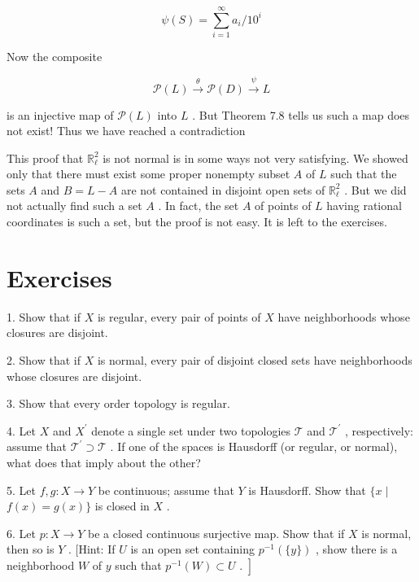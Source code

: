 \[
\psi \left( S\right)  = \mathop{\sum }\limits_{{i = 1}}^{\infty }{a}_{i}/{10}^{i}
\]

Now the composite

\[
\mathcal{P}\left( L\right) \overset{\theta }{ \rightarrow  }\mathcal{P}\left( D\right) \overset{\psi }{ \rightarrow  }L
\]

is an injective map of \(\mathcal{P}\left( L\right)\) into \(L\) . But Theorem 7.8 tells us such a map does not exist! Thus we have reached a contradiction

This proof that \({\mathbb{R}}_{\ell }^{2}\) is not normal is in some ways not very satisfying. We showed only that there must exist some proper nonempty subset \(A\) of \(L\) such that the sets \(A\) and \(B = L - A\) are not contained in disjoint open sets of \({\mathbb{R}}_{\ell }^{2}\) . But we did not actually find such a set \(A\) . In fact, the set \(A\) of points of \(L\) having rational coordinates is such a set, but the proof is not easy. It is left to the exercises.

\section*{Exercises}

1. Show that if \(X\) is regular, every pair of points of \(X\) have neighborhoods whose closures are disjoint.

2. Show that if \(X\) is normal, every pair of disjoint closed sets have neighborhoods whose closures are disjoint.

3. Show that every order topology is regular.

4. Let \(X\) and \({X}^{\prime }\) denote a single set under two topologies \(\mathcal{T}\) and \({\mathcal{T}}^{\prime }\) , respectively: assume that \({\mathcal{T}}^{\prime } \supset  \mathcal{T}\) . If one of the spaces is Hausdorff (or regular, or normal), what does that imply about the other?

5. Let \(f,g : X \rightarrow  Y\) be continuous; assume that \(Y\) is Hausdorff. Show that \(\{ x \mid\)  \(f\left( x\right)  = g\left( x\right) \}\) is closed in \(X\) .

6. Let \(p : X \rightarrow  Y\) be a closed continuous surjective map. Show that if \(X\) is normal, then so is \(Y\) . [Hint: If \(U\) is an open set containing \({p}^{-1}\left( {\{ y\} }\right)\) , show there is a neighborhood \(W\) of \(y\) such that \(\left. {{p}^{-1}\left( W\right)  \subset  U\text{ . }}\right\rbrack\)

